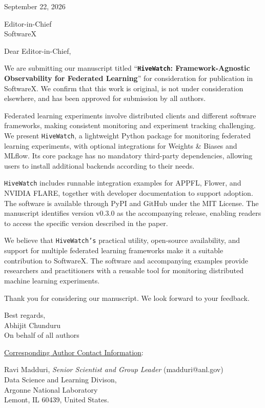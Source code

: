 \documentclass[10pt]{letter}
\begin{document}
September 22, 2026

Editor-in-Chief\\
SoftwareX

Dear Editor-in-Chief,

We are submitting our manuscript titled
``\textbf{\texttt{HiveWatch}: Framework-Agnostic Observability for Federated Learning}'' for consideration for publication
in SoftwareX. We confirm that this work is original, is not
under consideration elsewhere, and has been approved for
submission by all authors.

Federated learning experiments involve distributed clients
and different software frameworks, making consistent monitoring
and experiment tracking challenging. We present \texttt{HiveWatch}, a
lightweight Python package for monitoring federated learning
experiments, with optional integrations for Weights \& Biases
and MLflow. Its core package has no mandatory third-party
dependencies, allowing users to install additional backends
according to their needs.

\texttt{HiveWatch} includes runnable integration examples for APPFL, Flower,
and NVIDIA FLARE, together with developer documentation to
support adoption. The software is available through PyPI and
GitHub under the MIT License. The manuscript identifies
version v0.3.0 as the accompanying release, enabling readers
to access the specific version described in the paper.

We believe that \texttt{HiveWatch's} practical utility, open-source
availability, and support for multiple federated learning
frameworks make it a suitable contribution to SoftwareX.
The software and accompanying examples provide researchers
and practitioners with a reusable tool for monitoring
distributed machine learning experiments.

Thank you for considering our manuscript. We look forward
to your feedback.

Best regards,\\
Abhijit Chunduru\\
On behalf of all authors

\medskip
\underline{Corresponding Author Contact Information}:

\begin{minipage}[t]{0.7\textwidth}
	Ravi Madduri, \textit{Senior Scientist and Group Leader} (madduri@anl.gov) \\
    
	Data Science and Learning Divison,\\
	Argonne National Laboratory\\
    Lemont, IL 60439, United States. \\
\end{minipage}
\end{document}
